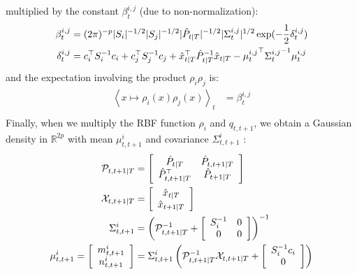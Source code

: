 multiplied by the constant $\beta^{i,j}_t$ (due to non-normalization):
\begin{align*}
  \beta^{i,j}_t &= (2\pi)^{-p} |S_i|^{-1/2} |S_j|^{-1/2} |\hat{P}_{t|T}|^{-1/2} |\Sigma^{i,j}_t|^{1/2} \exp(-\frac{1}{2} \delta^{i,j}_t)\\
  \delta^{i,j}_t &= c_i^{\top} S_i^{-1} c_i + c_j^{\top} S_j^{-1} c_j + \hat{x}_{t \mathbin{\vert} T}^{\top} \hat{P}_{t \mathbin{\vert} T}^{-1} \hat{x}_{t \mathbin{\vert} T} - {\mu^{i,j}_t}^{\top} {\Sigma^{i,j}_t}^{-1} \mu^{i,j}_t\\
\end{align*}
and the expectation involving the product $\rho_i \rho_j$ is:
\begin{align*}
  \left< x \mapsto \rho_i(x)\rho_j(x)\right>_{t} &= \beta^{i,j}_t\\
\end{align*}
Finally, when we multiply the RBF function $\rho_i$ and $q_{t,t+1}$, we obtain a Gaussian density in $\mathbb{R}^{2p}$ with mean $\mu^i_{t,t+1}$ and covariance $\Sigma^i_{t,t+1}$ :
\begin{align*}
  \mathcal{P}_{t,t+1 \mathbin{\vert} T} &= 
    \left[
      \begin{array}{cc} \hat{P}_{t \mathbin{\vert} T} & \hat{P}_{t,t+1 \mathbin{\vert} T}\\ \hat{P}_{t,t+1 \mathbin{\vert} T}^{\top} & \hat{P}_{t+1 \mathbin{\vert} T} \end{array}
    \right]
  \\
  \mathcal{X}_{t,t+1 \mathbin{\vert} T} &=
    \left[
      \begin{array}{c} \hat{x}_{t \mathbin{\vert} T} \\ \hat{x}_{t+1 \mathbin{\vert} T} \end{array}
    \right]
  \\
  \Sigma^i_{t,t+1} &=
    \left(
      \mathcal{P}_{t,t+1 \mathbin{\vert} T}^{-1}
       +
      \left[
        \begin{array}{cc} S_i^{-1} & 0\\ 0 & 0 \end{array}
      \right]
    \right)^{-1}
  \\
  \mu^i_{t,t+1} =
    \left[
      \begin{array}{c} m^i_{t,t+1} \\ n^i_{t,t+1} \end{array}
    \right]
    &=
    \Sigma^i_{t,t+1}
      \left(
        \mathcal{P}_{t,t+1 \mathbin{\vert} T}^{-1} \mathcal{X}_{t,t+1 \mathbin{\vert} T}
        +
        \left[
          \begin{array}{c} S_i^{-1}c_i \\ 0 \end{array}
        \right]
      \right)
  \\
\end{align*}
